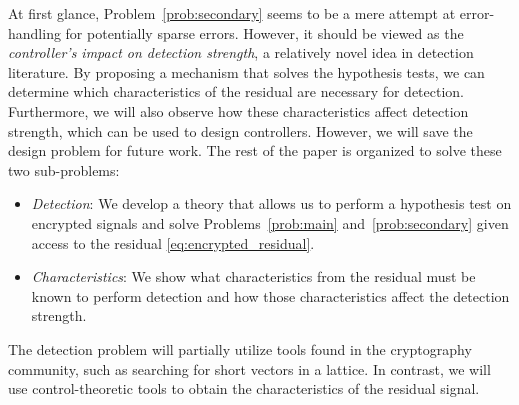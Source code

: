 \documentclass[journal, twoside, web]{ieeecolorpreprint}
\newtheorem{rem}{Remark}
\begin{document}
At first glance, Problem~\ref{prob:secondary} seems to be a mere attempt at error-handling for potentially sparse errors. However, it should be viewed as the \emph{controller's impact on detection strength}, a relatively novel idea in detection literature. By proposing a mechanism that solves the hypothesis tests, we can determine which characteristics of the residual are necessary for detection. Furthermore, we will also observe how these characteristics affect detection strength, which can be used to design controllers. However, we will save the design problem for future work.
The rest of the paper is organized to solve these two sub-problems:
\begin{itemize}
    \item \label{point:detect} \emph{Detection}: We develop a theory that allows us to perform a hypothesis test on encrypted signals and solve Problems~\ref{prob:main} and~\ref{prob:secondary} given access to the residual \eqref{eq:encrypted_residual}.
    \item \emph{Characteristics}: We show what characteristics from the residual must be known to perform detection and how those characteristics affect the detection strength.
\end{itemize}
The detection problem will partially utilize tools found in the cryptography community, such as searching for short vectors in a lattice. In contrast, we will use control-theoretic tools to obtain the characteristics of the residual signal.

\end{document}
